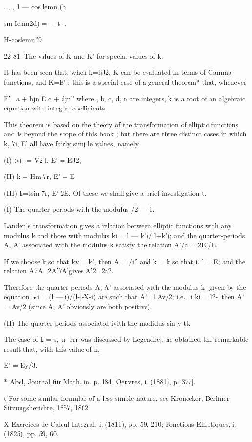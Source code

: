 . , , 1 — cos lemn (b

sm Iemn2d) = - --t- .

H-coslemn''9

22-81. The values of K and K' for special values of k.

It has been seen that, when k=ljJ2, K can be evaluated in terms of
Gamma-functions, and K=E' ; this is a special case of a general
theorem* that, whenever

E' \ a + hjn E c + djn'' where , b, c, d, n are integers, k is a root
of an algebraic equation with integral coefficients.

This theorem is based on the theory of the transformation of elliptic
functions and is beyond the scope of this book ; but there are three
distinct cases in which k, 7i, E' all have fairly simj le values,
namely

(I) >(- = V2-l, E' = EJ2,

(II) k = Hm 7r, E' = E %

(III) k=tsin 7r, E' 2E. Of these we shall give a brief investigation
t.

(I) The quarter-periods with the modulus /2 — 1.

Landen's transformation gives a relation between elliptic functions
with any modulus k and those with modulus ki = l — k')/ l+k'); and the
quarter-periods A, A' associated with the modulus k satisfy the
relation A'/a = 2E'/E.

If we choose k so that ky = k', then A = /i'' and k = k so that i. ' =
E; and the relation A7A=2A'7A'gives A'2=2a2.

Therefore the quarter-periods A, A' associated with the modulus k-
given by the equation •i = (l — i)/(l-|-X-i) are such that A'=±Av/2;
i.e. \ i ki = l2-\, then A' = Av/2 (since A, A' obviously are both
positive).

(II) The quarter-periods associated ivith the modidus sin y tt.

The case of k = s,\ n -rrr was discussed by Legendre|; he obtained the
remarkable result that, with this value of k,

E' = Ey/3.

* Abel, Journal fiir Math. in. p. 184 [Oeuvres, i. (1881), p. 377].

t For some similar formulae of a less simple nature, see Kronecker,
Berliner Sitzungsherichte, 1857, 1862.

X Exercices de Calcul Integral, i. (1811), pp. 59, 210; Fonctions
Elliptiques, i. (1825), pp. 59, 60.



